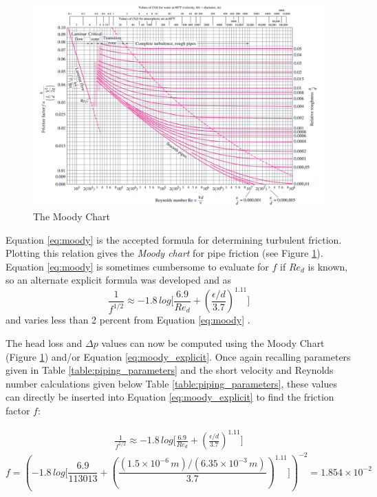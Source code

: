 \documentclass[9pt]{article} %
\numberwithin{equation}{section} %
\begin{document}
\begin{figure}[!htb]
\centering
\includegraphics[scale=0.55]{moody_chart.PNG}
\caption{The Moody Chart \cite{fluid-mechanics}}
\label{fig:moody_chart}
\end{figure}

Equation \ref{eq:moody} is the accepted formula for determining turbulent friction. Plotting this relation gives the \textit{Moody chart} for pipe friction (see Figure \ref{fig:moody_chart}). Equation \ref{eq:moody} is sometimes cumbersome to evaluate for $f$ if $Re_{d}$ is known, so an alternate explicit formula was developed and as
\begin{equation} \label{eq:moody_explicit}
\frac{1}{f^{1/2}} \approx -1.8\, log \Big[ \frac{6.9}{Re_{d}} + \left( \frac{\epsilon / d}{3.7} \right)^{1.11} \Big]
\end{equation}
and varies less than 2 percent from Equation \ref{eq:moody} \cite{fluid-mechanics}.

The head loss and $\Delta p$ values can now be computed using the Moody Chart (Figure \ref{fig:moody_chart}) and/or Equation \ref{eq:moody_explicit}. Once again recalling parameters given in Table \ref{table:piping_parameters} and the short velocity and Reynolds number calculations given below Table \ref{table:piping_parameters}, these values can directly be inserted into Equation \ref{eq:moody_explicit} to find the friction factor $f$:

\begin{align*}
\frac{1}{f^{1/2}} \approx -1.8\, log \Big[ \frac{6.9}{Re_{d}} + \left( \frac{\epsilon / d}{3.7} \right)^{1.11} \Big]
\end{align*}
\begin{equation*}
f = \left( -1.8\, log \Bigg[ \frac{6.9}{113013} + \left( \frac{(1.5 \times 10^{-6}\, m)/(6.35 \times 10^{-3}\, m)}{3.7} \right) ^{1.11} \Bigg] \right)^{-2} = 1.854 \times 10^{-2}
\end{equation*}
\end{document}
